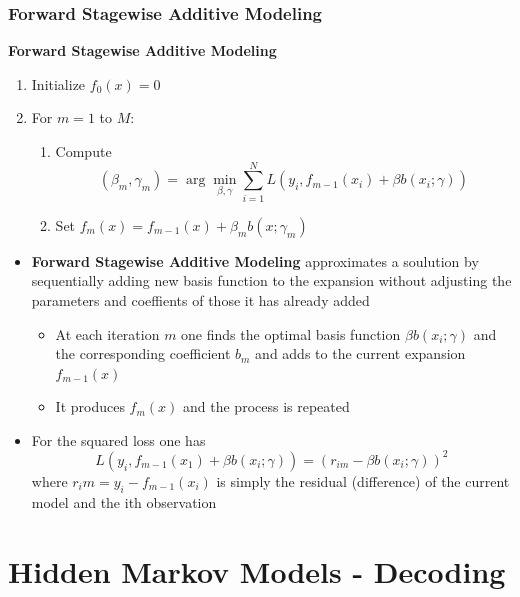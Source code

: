 \documentclass[a4, english]{article}
\begin{document}
\subsubsection{Forward Stagewise Additive Modeling}
\begin{framed}
\begin{center}  
  \textbf{Forward Stagewise Additive Modeling}
\end{center}
\begin{enumerate}
  \item Initialize $f_0(x) = 0$ 
  \item For $m=1$ to $M$:
  \begin{enumerate}
  	\item Compute
    \begin{equation*}
      (\beta_m, \gamma_m) = \arg \min_{\beta, \gamma} \sum_{i=1}^N L(y_i, f_{m-1}(x_i) + \beta b(x_i; \gamma))
    \end{equation*}
    \item Set $f_m(x)=f_{m-1}(x) + \beta_m b(x; \gamma_m)$   
  \end{enumerate}
\end{enumerate} 
\end{framed}
\begin{itemize}
	\item \textbf{Forward Stagewise Additive Modeling} approximates a soulution by sequentially adding new basis function to the expansion without adjusting the parameters and coeffients of those it has already added   
  \begin{itemize}
  	\item At each iteration $m$ one finds the optimal basis function $\beta b(x_i; \gamma)$ and the corresponding coefficient $b_m$ and adds to the current expansion $f_{m-1}(x)$ 
    \item It produces $f_m(x)$ and the process is repeated
  \end{itemize}
  \item For the squared loss one has 
\begin{equation*}
      L(y_i, f_{m-1}(x_1)+\beta b(x_i;\gamma)) = (r_{im}-\beta b(x_i;\gamma))^2
\end{equation*}
  where $r_im = y_i - f_{m-1}(x_i)$ is simply the residual (difference) of the current model and the ith observation
\end{itemize}
\newpage

\section{Hidden Markov Models - Decoding}
\end{document}
